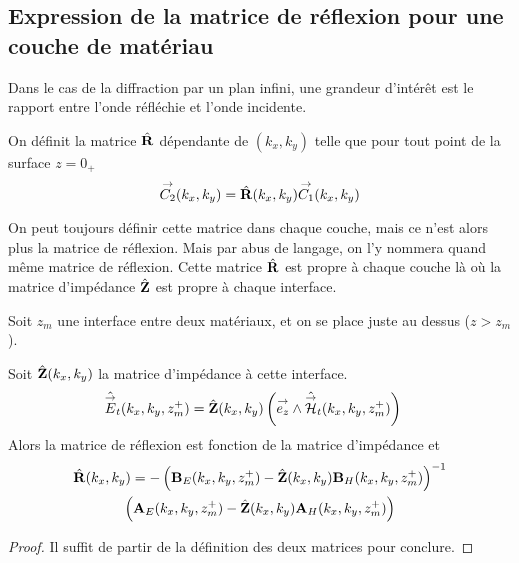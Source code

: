     \subsection{Expression de la matrice de réflexion pour une couche de matériau}

        Dans le cas de la diffraction par un plan infini, une grandeur d’intérêt est le rapport entre l'onde réfléchie et l'onde incidente.
         
        \begin{defn}
          On définit la matrice \(\hat{\mathbf{R}}\) dépendante de \((k_x,k_y)\) telle que pour tout point de la surface \(z=0_+\)
          \begin{equation}
            {\overset{\rightarrow}{C_2}}(k_x,k_y)  = \hat{\mathbf{R}}(k_x,k_y) {\overset{\rightarrow}{C_1}}(k_x,k_y)
          \end{equation}
        \end{defn}

        On peut toujours définir cette matrice dans chaque couche, mais ce n'est alors plus la matrice de réflexion. Mais par abus de langage, on l'y nommera quand même matrice de réflexion.
        Cette matrice \(\hat{\mathbf{R}}\) est propre à chaque couche là où la matrice d'impédance \(\hat{\mathbf{Z}}\) est propre à chaque interface.

        \begin{lemme}
            \label{lem:plan:reflexion_from_impedance}
            Soit \(z_m\) une interface entre deux matériaux, et on se place juste au dessus (\(z>z_m\)). 

            Soit \(\hat{\mathbf{Z}}(k_x,k_y)\) la matrice d'impédance à cette interface.
            \begin{align*}
                \hat{{\overset{\rightarrow}{E}}}_t(k_x,k_y,z_m^+) &= \hat{\mathbf{Z}}(k_x,k_y) \left({\overset{\rightarrow}{e_z}} \wedge \hat{{\overset{\rightarrow}{\mathcal{H}}}}_t(k_x,k_y,z_m^+)\right)
            \end{align*}
            Alors la matrice de réflexion est fonction de la matrice d'impédance et
            \begin{multline*}
                    \hat{\mathbf{R}}(k_x,k_y) = - \left(\mathbf{B}_E(k_x,k_y,z_m^+) - \hat{\mathbf{Z}}(k_x,k_y) \mathbf{B}_H(k_x,k_y,z_m^+) \right)^{-1}\\
                    \left(\mathbf{A}_E(k_x,k_y,z_m^+) - \hat{\mathbf{Z}}(k_x,k_y) \mathbf{A}_H(k_x,k_y,z_m^+) \right)
            \end{multline*}
        \end{lemme}
        \begin{proof}
            Il suffit de partir de la définition des deux matrices pour conclure.
        \end{proof}

